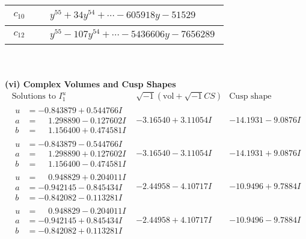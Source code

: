\documentclass[1p]{elsarticle_modified}
\theoremstyle{definition}
\newcommand{\I}{\sqrt{-1}}
\begin{document}
\begin{tabular}{m{50pt}|m{274pt}}
\hline $$\begin{aligned}c_{10}\end{aligned}$$&$\begin{aligned}
&y^{55}+34 y^{54}+\cdots-605918 y-51529
\end{aligned}$\\
\hline $$\begin{aligned}c_{12}\end{aligned}$$&$\begin{aligned}
&y^{55}-107 y^{54}+\cdots-5436606 y-7656289
\end{aligned}$\\
\hline
\end{tabular}\\~\\
\newpage\flushleft \textbf{(vi) Complex Volumes and Cusp Shapes}
$$\begin{array}{c|c|c}  
\text{Solutions to }I^u_{1}& \I (\text{vol} + \sqrt{-1}CS) & \text{Cusp shape}\\
 \hline 
\begin{aligned}
u &= -0.843879 + 0.544766 I \\
a &= \phantom{-}1.298890 - 0.127602 I \\
b &= \phantom{-}1.156400 + 0.474581 I\end{aligned}
 & -3.16540 + 3.11054 I & -14.1931 - 9.0876 I \\ \hline\begin{aligned}
u &= -0.843879 - 0.544766 I \\
a &= \phantom{-}1.298890 + 0.127602 I \\
b &= \phantom{-}1.156400 - 0.474581 I\end{aligned}
 & -3.16540 - 3.11054 I & -14.1931 + 9.0876 I \\ \hline\begin{aligned}
u &= \phantom{-}0.948829 + 0.204011 I \\
a &= -0.942145 - 0.845434 I \\
b &= -0.842082 - 0.113281 I\end{aligned}
 & -2.44958 - 4.10717 I & -10.9496 + 9.7884 I \\ \hline\begin{aligned}
u &= \phantom{-}0.948829 - 0.204011 I \\
a &= -0.942145 + 0.845434 I \\
b &= -0.842082 + 0.113281 I\end{aligned}
 & -2.44958 + 4.10717 I & -10.9496 - 9.7884 I \\ \hline\begin{aligned}

\end{aligned}
\end{array}$$
\end{document}
